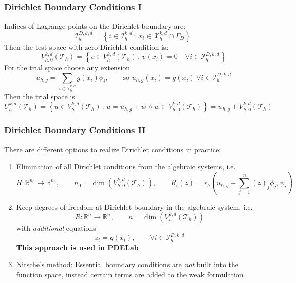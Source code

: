 \documentclass[aspectratio=169,11pt]{beamer}
\theoremstyle{definition}
\begin{document}
\begin{frame}
\frametitle{Dirichlet Boundary Conditions I}
Indices of Lagrange points on the Dirichlet boundary are:
\begin{equation*}
\mathcal{I}_h^{D,k,d} =
\left\{ i\in\mathcal{I}_h^{k,d}  \,:\,
x_i\in\mathcal{X}_h^{k,d} \cap\Gamma_D
\right\} .
\end{equation*}
Then the test space with zero Dirichlet condition is:
\begin{equation*}
V_{h,0}^{k,d}(\mathcal{T}_{h}) = \left\{
v\in V_{h}^{k,d}(\mathcal{T}_{h}) \,:\, v(x_i) = 0
\quad \forall i\in\mathcal{I}_h^{D,k,d}
 \right\}
\end{equation*}
For the trial space choose any extension
\begin{equation*}
u_{h,g} = \sum_{i\in \mathcal{I}_h^{k,d}}
g(x_i) \phi_i, \qquad \text{so $u_{h,g}(x_i)=g(x_i) \ \forall i\in\mathcal{I}_h^{D,k,d}$}
\end{equation*}
Then the trial space is
\begin{equation*}
U_{h}^{k,d}(\mathcal{T}_{h}) = \left\{ u\in V_h^{k,d}(\mathcal{T}_h)
\,:\, u = u_{h,g} + w \wedge w\in V_{h,0}^{k,d}(\mathcal{T}_{h})\right\} = u_{h,g} + V_{h,0}^{k,d}(\mathcal{T}_{h})
\end{equation*}
\end{frame}

\begin{frame}
\frametitle{Dirichlet Boundary Conditions II}
There are different options to realize Dirichlet conditions in practice:
\begin{enumerate}
\item Elimination of all Dirichlet conditions from the algebraic systems, i.e.
\begin{equation*}
R: \mathbb{R}^{n_0} \to \mathbb{R}^{n_0}, \qquad 
n_0 = \dim\left( V_{h,0}^{k,d}(\mathcal{T}_{h}) \right), \qquad
R_i(z) = r_h\left(u_{h,g} +\sum_{j=1}^n (z)_j\phi_j,\psi_i\right)
\end{equation*}
\item Keep degrees of freedom at Dirichlet boundary in the algebraic system, i.e.
\begin{equation*}
R: \mathbb{R}^n \to \mathbb{R}^n, \qquad n = \dim\left( V_{h}^{k,d}(\mathcal{T}_{h}) \right)
\end{equation*}
with \textit{additional} equations
\begin{equation*}
z_i = g(x_i), \qquad \forall i\in\mathcal{I}_h^{D,k,d}
\end{equation*}
\textbf{This approach is used in PDELab}
\item Nitsche's method: Essential boundary conditions are \textit{not} built into the function space, instead certain terms are added to
the weak formulation
\end{enumerate}
\end{frame}
\end{document}
